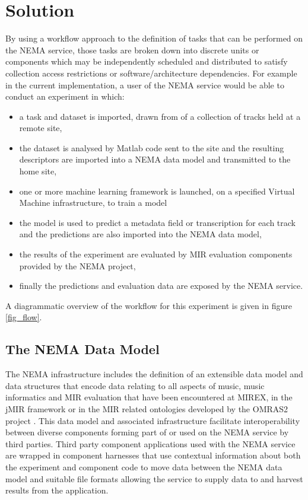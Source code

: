 \documentclass[conference]{IEEEtran}
\begin{document}
\section{Solution}
By using a workflow approach to the definition of tasks that can be performed on the NEMA service, those tasks are broken down into discrete units or components which may be independently scheduled and distributed to satisfy collection access restrictions or software/architecture dependencies. For example in the current implementation, a user of the NEMA service would be able to conduct an experiment in which:
\begin{itemize}
\item a task and dataset is imported, drawn from of a collection of tracks held at a remote site,
\item the dataset is analysed by Matlab code sent to the site and the resulting descriptors are imported into a NEMA data model and transmitted to the home site, 
\item one or more machine learning framework is launched, on a specified Virtual Machine infrastructure, to train a model
\item the model is used to predict a metadata field or transcription for each track and the predictions are also imported into the NEMA data model,
\item the results of the experiment are evaluated by MIR evaluation components provided by the NEMA project,
\item finally the predictions and evaluation data are exposed by the NEMA service.
\end{itemize}
A diagrammatic overview of the workflow for this experiment is given in figure \ref{fig_flow}.



\subsection{The NEMA Data Model}
The NEMA infrastructure includes the definition of an extensible data model and data structures that encode data relating to all aspects of music, music informatics and MIR evaluation that have been encountered at MIREX, in the jMIR framework \cite{mckay2009jmir} or in the MIR related ontologies developed by the OMRAS2 project \cite{raimond2007music}. This data model and associated infrastructure facilitate interoperability between diverse components forming part of or used on the NEMA service by third parties. Third party component applications used with the NEMA service are wrapped in component harnesses that use contextual information about both the experiment and component code to move data between the NEMA data model and suitable file formats allowing the service to supply data to and harvest results from the application.  %
\end{document}
